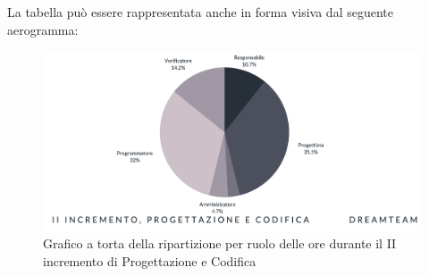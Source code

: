 La tabella può essere rappresentata anche in forma visiva dal seguente aerogramma:
\begin{figure}[H]
\centering
\includegraphics[scale=0.50]{Sezioni/SezioniPreventivo/grafici/progettazione/Progettazione_II_incremento_costi.png}
\caption{Grafico a torta della ripartizione per ruolo delle ore durante il II incremento di Progettazione e Codifica}
\end{figure}

\pagebreak


